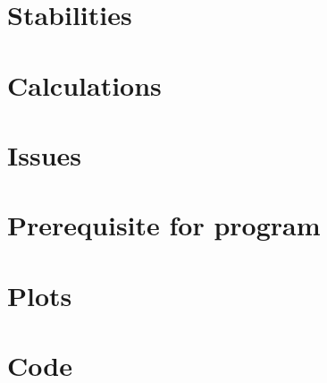 \begin{appendix}
	\chapter{Stabilities}\label{app:stabilities}
		
	\chapter{Calculations}
		
	\chapter{Issues}
		
	\chapter{Prerequisite for program}
		
	\chapter{Plots}
		
		
		
	\chapter{Code}
		
\end{appendix}